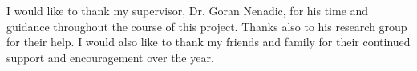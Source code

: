 I would like to thank my supervisor, Dr. Goran Nenadic, for his time and guidance throughout the course of this project. Thanks also to his research group for their help. I would also like to thank my friends and family for their continued support and encouragement over the year.


